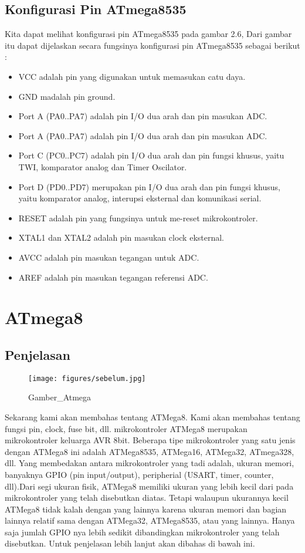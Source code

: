 		\subsection{Konfigurasi Pin ATmega8535}
		 Kita dapat melihat konfigurasi pin ATmega8535 pada gambar 2.6, Dari gambar itu dapat dijelaskan secara fungsinya konfigurasi pin ATmega8535 sebagai berikut :
		\begin{itemize}
			\item VCC adalah pin yang digunakan untuk memasukan catu daya.
			\item GND madalah pin ground.
			\item Port A (PA0..PA7) adalah pin I/O dua arah dan pin masukan ADC.
			\item Port A (PA0..PA7) adalah pin I/O dua arah dan pin masukan ADC.
			\item Port C (PC0..PC7) adalah pin I/O dua arah dan pin fungsi khusus, yaitu TWI, komparator analog dan Timer Oscilator.
			\item Port D (PD0..PD7) merupakan pin I/O dua arah dan pin fungsi khusus, yaitu komparator analog, interupsi eksternal dan komunikasi serial.
			\item RESET adalah pin yang fungsinya untuk me-reset mikrokontroler.
			\item XTAL1 dan XTAL2 adalah pin masukan clock eksternal.
			\item AVCC adalah pin masukan tegangan untuk ADC.
			\item AREF adalah pin masukan tegangan referensi ADC.
		\end{itemize}

\section{ATmega8}

	\subsection{Penjelasan}
		
		\begin{figure}[ht]
			\centerline{\texttt{[image: figures/sebelum.jpg]}}
			\caption{Gamber_Atmega}
			\label{atmega8}
			\end{figure}
			
		Sekarang kami akan membahas tentang ATMega8. Kami akan membahas tentang fungsi pin, clock, fuse bit, dll. mikrokontroler ATMega8 merupakan mikrokontroler keluarga AVR 8bit. Beberapa tipe mikrokontroler yang satu jenis dengan ATMega8 ini adalah ATMega8535, ATMega16, ATMega32, ATmega328, dll. Yang membedakan antara mikrokontroler yang tadi adalah, ukuran memori, banyaknya GPIO (pin input/output), peripherial (USART, timer, counter, dll).Dari segi ukuran fisik, ATMega8 memiliki ukuran yang lebih kecil dari pada mikrokontroler yang telah disebutkan diatas. Tetapi walaupun ukurannya kecil ATMega8 tidak kalah dengan yang lainnya karena ukuran memori dan bagian lainnya relatif sama dengan ATMega32, ATMega8535, atau yang lainnya. Hanya saja jumlah GPIO nya lebih sedikit dibandingkan mikrokontroler yang telah disebutkan. Untuk penjelasan lebih lanjut akan dibahas di bawah ini.
	
